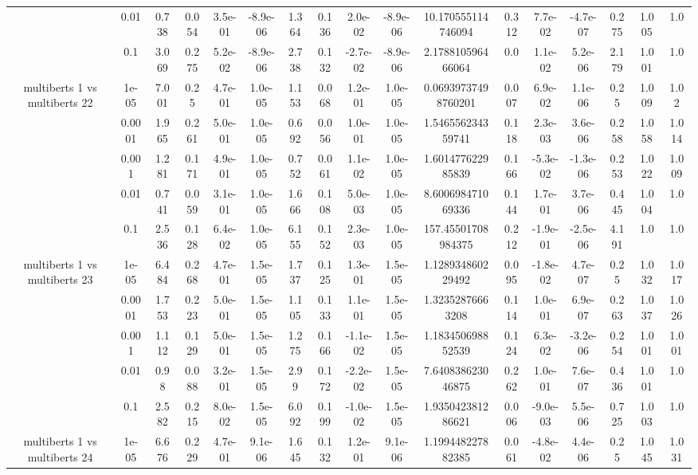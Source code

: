 \begin{tabular}{|c|c|c|c|c|c|c|c|c|c|c|c|c|c|c|c|c|}
 & 0.01 & 0.738 & 0.054 & 3.5e-01 & -8.9e-06 & 1.364 & 0.136 & 2.0e-02 & -8.9e-06 & 10.170555114746094 & 0.312 & 7.7e-02 & -4.7e-07 & 0.275 & 1.005 & 1.0 \\
 & 0.1 & 3.069 & 0.275 & 5.2e-02 & -8.9e-06 & 2.738 & 0.132 & -2.7e-02 & -8.9e-06 & 2.178810596466064 & 0.0 & 1.1e-02 & 5.2e-06 & 2.179 & 1.001 & 1.0 \\
\hline
\multirow{5}{*}{multiberts 1 vs multiberts 22} & 1e-05 & 7.001 & 0.25 & 4.7e-01 & 1.0e-05 & 1.153 & 0.068 & 1.2e-01 & 1.0e-05 & 0.06939737498760201 & 0.007 & 6.9e-02 & 1.1e-06 & 0.25 & 1.009 & 1.02 \\
 & 0.0001 & 1.965 & 0.261 & 5.0e-01 & 1.0e-05 & 0.692 & 0.056 & 1.0e-01 & 1.0e-05 & 1.546556234359741 & 0.118 & 2.3e-03 & 3.6e-06 & 0.258 & 1.058 & 1.014 \\
 & 0.001 & 1.281 & 0.171 & 4.9e-01 & 1.0e-05 & 0.752 & 0.061 & 1.1e-02 & 1.0e-05 & 1.601477622985839 & 0.166 & -5.3e-02 & -1.3e-06 & 0.253 & 1.022 & 1.009 \\
 & 0.01 & 0.741 & 0.059 & 3.1e-01 & 1.0e-05 & 1.666 & 0.108 & 5.0e-03 & 1.0e-05 & 8.600698471069336 & 0.144 & 1.7e-01 & 3.7e-06 & 0.445 & 1.004 & 1.0 \\
 & 0.1 & 2.536 & 0.128 & 6.4e-02 & 1.0e-05 & 6.155 & 0.152 & 2.3e-03 & 1.0e-05 & 157.45501708984375 & 0.212 & -1.9e-01 & -2.5e-06 & 4.191 & 1.0 & 1.0 \\
\hline
\multirow{5}{*}{multiberts 1 vs multiberts 23} & 1e-05 & 6.484 & 0.268 & 4.7e-01 & 1.5e-05 & 1.737 & 0.125 & 1.3e-01 & 1.5e-05 & 1.128934860229492 & 0.095 & -1.8e-02 & 4.7e-07 & 0.25 & 1.032 & 1.017 \\
 & 0.0001 & 1.753 & 0.223 & 5.0e-01 & 1.5e-05 & 1.105 & 0.133 & 1.1e-01 & 1.5e-05 & 1.32352876663208 & 0.114 & 1.0e-01 & 6.9e-07 & 0.263 & 1.037 & 1.026 \\
 & 0.001 & 1.112 & 0.129 & 5.0e-01 & 1.5e-05 & 1.275 & 0.166 & -1.1e-02 & 1.5e-05 & 1.183450698852539 & 0.124 & 6.3e-02 & -3.2e-06 & 0.254 & 1.001 & 1.001 \\
 & 0.01 & 0.98 & 0.088 & 3.2e-01 & 1.5e-05 & 2.99 & 0.172 & -2.2e-02 & 1.5e-05 & 7.640838623046875 & 0.262 & 1.0e-01 & 7.6e-07 & 0.436 & 1.001 & 1.0 \\
 & 0.1 & 2.582 & 0.215 & 8.0e-02 & 1.5e-05 & 6.092 & 0.199 & -1.0e-02 & 1.5e-05 & 1.935042381286621 & 0.006 & -9.0e-03 & 5.5e-06 & 0.725 & 1.003 & 1.0 \\
\hline
\multirow{5}{*}{multiberts 1 vs multiberts 24} & 1e-05 & 6.676 & 0.229 & 4.7e-01 & 9.1e-06 & 1.645 & 0.132 & 1.2e-01 & 9.1e-06 & 1.199448227882385 & 0.061 & -4.8e-02 & 4.4e-06 & 0.25 & 1.045 & 1.031 \\

\end{tabular}
